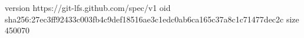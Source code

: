version https://git-lfs.github.com/spec/v1
oid sha256:27ec3ff92433c003fb4c9def18516ae3c1edc0ab6ca165c37a8c1c71477dec2c
size 450070

